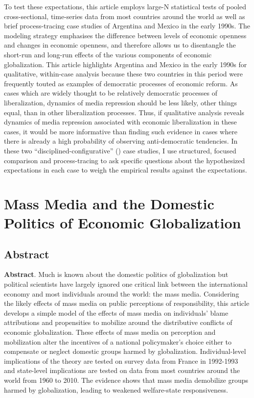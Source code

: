 \documentclass[12pt]{report}
\begin{document}
To test these expectations, this article employs large-N statistical tests of pooled cross-sectional, time-series data from most countries around the world as well as brief process-tracing case studies of Argentina and Mexico in the early 1990s. The modeling strategy emphasises the difference between levels of economic openness and changes in economic openness, and therefore allows us to disentangle the short-run and long-run effects of the various components of economic globalization. This article highlights Argentina and Mexico in the early 1990s for qualitative, within-case analysis because these two countries in this period were frequently touted as examples of democratic processes of economic reform. As cases which are widely thought to be relatively democratic processes of liberalization, dynamics of media repression should be less likely, other things equal, than in other liberalization processes. Thus, if qualitative analysis reveals dynamics of media repression associated with economic liberalization in these cases, it would be more informative than finding such evidence in cases where there is already a high probability of observing anti-democratic tendencies. In these two ``disciplined-configurative'' (\citealt[75]{george2005case}) case studies, I use structured, focused comparison and process-tracing to ask specific questions about the hypothesized expectations in each case to weigh the empirical results against the expectations.


\chapter{Mass Media and the Domestic Politics of Economic Globalization}

\section{Abstract}

\textbf{Abstract}. Much is known about the domestic politics of globalization but political scientists
have largely ignored one critical link between the international economy and most individuals around
the world: the mass media. Considering the likely effects of mass media on public perceptions of
responsibility, this article develops a simple model of the effects of mass media on individuals'
blame attributions and propensities to mobilize around the distributive conflicts of economic
globalization. These effects of mass media on perception and mobilization alter the incentives of a
national policymaker's choice either to compensate or neglect domestic groups harmed by
globalization. Individual-level implications of the theory are tested on survey data from France in
1992-1993 and state-level implications are tested on data from most countries around the world from
1960 to 2010. The evidence shows that mass media demobilize groups harmed by globalization, leading
to weakened welfare-state responsiveness.
\end{document}
